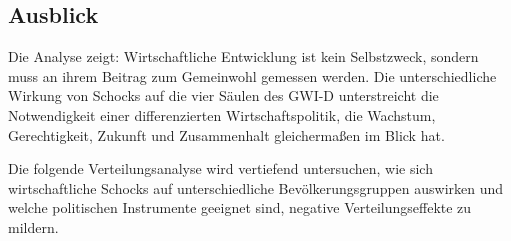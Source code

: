 \subsection{Ausblick}

Die Analyse zeigt: Wirtschaftliche Entwicklung ist kein Selbstzweck, sondern muss an ihrem Beitrag zum Gemeinwohl gemessen werden. Die unterschiedliche Wirkung von Schocks auf die vier Säulen des GWI-D unterstreicht die Notwendigkeit einer differenzierten Wirtschaftspolitik, die Wachstum, Gerechtigkeit, Zukunft und Zusammenhalt gleichermaßen im Blick hat.

Die folgende Verteilungsanalyse wird vertiefend untersuchen, wie sich wirtschaftliche Schocks auf unterschiedliche Bevölkerungsgruppen auswirken und welche politischen Instrumente geeignet sind, negative Verteilungseffekte zu mildern.